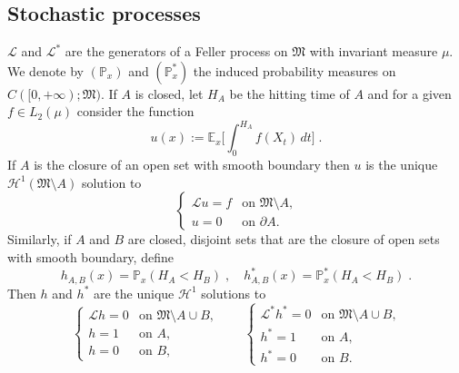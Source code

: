 \documentclass[reqno]{amsart}
\newcounter{as}[section]
\newcommand{\mc}[1]{{\mathcal #1}}
\newcommand{\mf}[1]{{\mathfrak #1}}
\newcommand{\bb}[1]{{\mathbb #1}}
\newcommand{\<}{\langle}
\renewcommand{\>}{\rangle}
\begin{document}
\subsection{Stochastic processes}
$\mc L$ and $\mc L^*$ are the generators of a Feller process on
$\mf M$ with invariant measure $\mu$. We denote by $(\bb P_x)$ and
$(\bb P_x^*)$ the induced probability measures on
$C([0,+\infty);\mf M)$.
If $A$ is closed, let $H_A$ be the hitting time of $A$ and for a given
$f\in L_2(\mu)$ consider the function
\begin{equation}
\label{e:ell}
u(x):=\bb E_x\Big[\int_0^{H_A} f(X_t)\,dt\Big]\;.
\end{equation}
If $A$ is the closure of an open set with smooth boundary then $u$ is
the unique $\mc H^1(\mf M\setminus A)$ solution to
\begin{equation}
\label{e:elleq}
\begin{cases}
\mc Lu=f & \text{on $\mf M\setminus A$,} \\
u=0 & \text{on $\partial A$.}
\end{cases}
\end{equation}
Similarly, if $A$ and $B$ are closed, disjoint sets that are the
closure of open sets with smooth boundary, define
\begin{equation*}
h_{A,B}(x)=\bb P_x(H_A<H_B) \;, \quad
h_{A,B}^*(x)=\bb P^*_x(H_A<H_B)\;.
\end{equation*}
Then $h$ and $h^*$ are the unique $\mc H^1$ solutions to
\begin{equation}
\label{e:heq}
\begin{cases}
 \mc Lh=0 & \text{on $\mf M\setminus A\cup B$,}
\\
h=1 & \text{on $A$,}
\\
h=0 & \text{on $B$,}
\end{cases}
\qquad
\begin{cases}
\mc L^* h^*=0 & \text{on $\mf M\setminus A\cup B$,}
\\
h^*=1 & \text{on $A$,}
\\
h^*=0 & \text{on $B$.}
\end{cases}
\end{equation}
\end{document}

